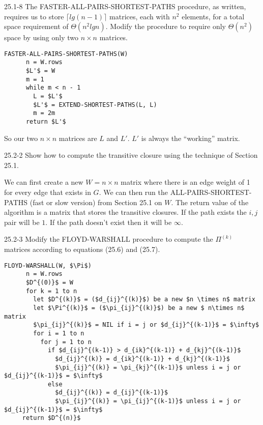 




\homeworkheader{\classnameandsection}

\begin{problem}{25.1-8}
  The FASTER-ALL-PAIRS-SHORTEST-PATHS procedure, as written, requires us to store $\lceil lg(n-1) \rceil$ matrices,
  each with $n^2$ elements, for a total space requirement of $\Theta(n^2 lg n)$. Modify the procedure to require only
  $\Theta(n^2)$ space by using only two $n \times n$ matrices.
  \begin{solution}
    \begin{lstlisting}[mathescape]
    FASTER-ALL-PAIRS-SHORTEST-PATHS(W)
      n = W.rows
      $L'$ = W
      m = 1
      while m < n - 1
        L = $L'$
        $L'$ = EXTEND-SHORTEST-PATHS(L, L)
        m = 2m
      return $L'$
    \end{lstlisting}
    
    \noindent So our two $n \times n$ matrices are $L$ and $L'$.  $L'$ is always the ``working'' matrix.
  \end{solution}
\end{problem}

\begin{problem}{25.2-2}
  Show how to compute the transitive closure using the technique of Section 25.1.
  \begin{solution}
    We can first create a new $ W = n \times n$ matrix where there is an edge weight of 1 for every edge that exists in
    $G$. We can then run the ALL-PAIRS-SHORTEST-PATHS (fast or slow version) from Section 25.1 on $W$. The return value
    of the algorithm is a matrix that stores the transitive closures.  If the path exists the $i,j$ pair will be $1$.
    If the path doesn't exist then it will be $\infty$.
  \end{solution}
\end{problem}

\newpage
\begin{problem}{25.2-3}
  Modify the FLOYD-WARSHALL procedure to compute the $\Pi^{(k)}$ matrices according to equations (25.6) and (25.7).
  \begin{solution}
    \begin{lstlisting}[mathescape]
      FLOYD-WARSHALL(W, $\Pi$)
      n = W.rows
      $D^{(0)}$ = W
      for k = 1 to n
        let $D^{(k)}$ = ($d_{ij}^{(k)}$) be a new $n \times n$ matrix
        let $\Pi^{(k)}$ = ($\pi_{ij}^{(k)}$) be a new $ n\times n$ matrix
        $\pi_{ij}^{(k)}$ = NIL if i = j or $d_{ij}^{(k-1)}$ = $\infty$ 
        for i = 1 to n
          for j = 1 to n
            if $d_{ij}^{(k-1)} > d_{ik}^{(k-1)} + d_{kj}^{(k-1)}$
              $d_{ij}^{(k)} = d_{ik}^{(k-1)} + d_{kj}^{(k-1)}$
              $\pi_{ij}^{(k)} = \pi_{kj}^{(k-1)}$ unless i = j or $d_{ij}^{(k-1)}$ = $\infty$
            else
              $d_{ij}^{(k)} = d_{ij}^{(k-1)}$
              $\pi_{ij}^{(k)} = \pi_{ij}^{(k-1)}$ unless i = j or $d_{ij}^{(k-1)}$ = $\infty$
     return $D^{(n)}$
    \end{lstlisting}
  \end{solution}
\end{problem}

